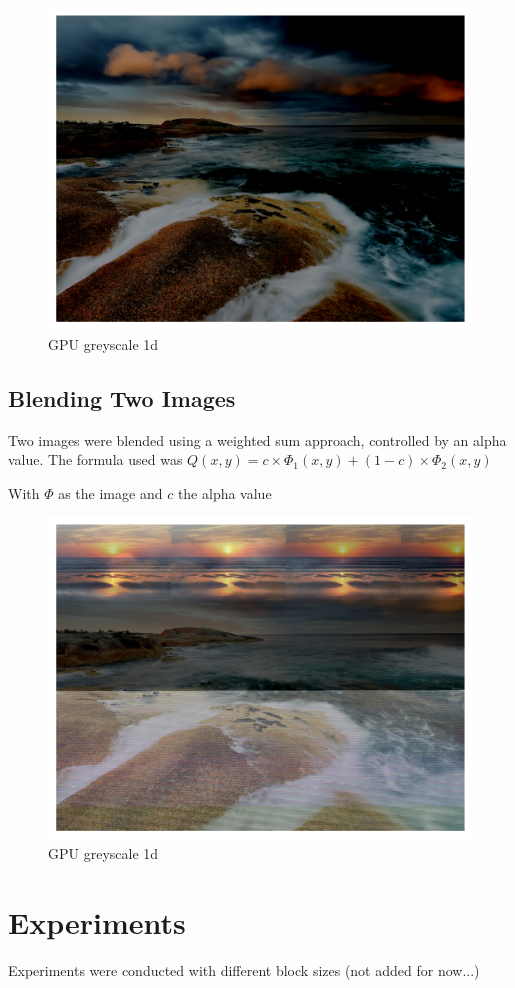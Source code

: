 \documentclass[a4paper]{article}
\begin{document}
\begin{figure}[ht!]
    \centering
    \includegraphics[scale=0.5]{../src/brightness.png}
    \caption{GPU greyscale 1d}
\end{figure}

\subsection{Blending Two Images}
Two images were blended using a weighted sum approach, controlled by an alpha value. The formula used was $Q(x, y) = c \times \Phi_1(x, y) + (1 - c) \times \Phi_2(x, y)$


With $\Phi$ as the image and $c$ the alpha value

\begin{figure}[ht!]
    \centering
    \includegraphics[scale=0.5]{../src/blend.png}
    \caption{GPU greyscale 1d}
\end{figure}

\section{Experiments}
Experiments were conducted with different block sizes (not added for now...)
\end{document}
